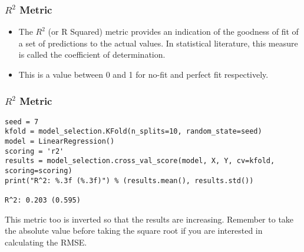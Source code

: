 \begin{frame}[fragile]\frametitle{$R^2$ Metric}

	\begin{itemize}
	\item The $R^2$ (or R Squared) metric provides an indication of the goodness of fit of a set of predictions to the actual values. In statistical literature, this measure is called the coefficient of determination.
	\item This is a value between 0 and 1 for no-fit and perfect fit respectively.
	\end{itemize}

\end{frame}

\begin{frame}[fragile]\frametitle{$R^2$ Metric}
\begin{lstlisting}
seed = 7
kfold = model_selection.KFold(n_splits=10, random_state=seed)
model = LinearRegression()
scoring = 'r2'
results = model_selection.cross_val_score(model, X, Y, cv=kfold, scoring=scoring)
print("R^2: %.3f (%.3f)") % (results.mean(), results.std())

R^2: 0.203 (0.595)
\end{lstlisting}

This metric too is inverted so that the results are increasing. Remember to take the absolute value before taking the square root if you are interested in calculating the RMSE.
\end{frame}

